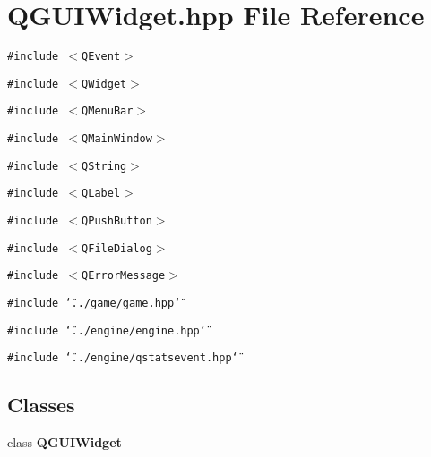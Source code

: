 \section{QGUIWidget.hpp File Reference}
\label{QGUIWidget_8hpp}
{\tt \#include $<$QEvent$>$}\par
{\tt \#include $<$QWidget$>$}\par
{\tt \#include $<$QMenu\-Bar$>$}\par
{\tt \#include $<$QMain\-Window$>$}\par
{\tt \#include $<$QString$>$}\par
{\tt \#include $<$QLabel$>$}\par
{\tt \#include $<$QPush\-Button$>$}\par
{\tt \#include $<$QFile\-Dialog$>$}\par
{\tt \#include $<$QError\-Message$>$}\par
{\tt \#include \char`\"{}../game/game.hpp\char`\"{}}\par
{\tt \#include \char`\"{}../engine/engine.hpp\char`\"{}}\par
{\tt \#include \char`\"{}../engine/qstatsevent.hpp\char`\"{}}\par
\subsection*{Classes}
\begin{CompactItemize}
\item 
class {\bf QGUIWidget}
\end{CompactItemize}
